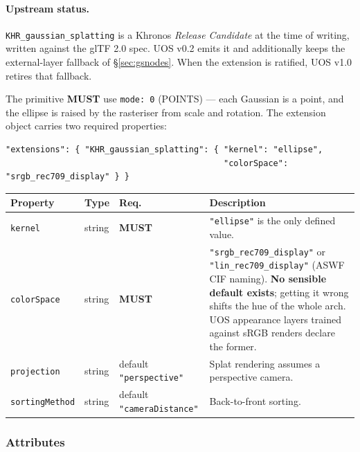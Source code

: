 \documentclass[11pt,a4paper]{article}
\newcommand{\MUST}{\textcolor{uosred}{\textbf{MUST}}}
\newcommand{\code}[1]{\texttt{\small #1}}
\begin{document}
\paragraph{Upstream status.} \code{KHR\_gaussian\_splatting} is a Khronos \emph{Release
Candidate} at the time of writing, written against the glTF 2.0 spec. UOS v0.2 emits it and
additionally keeps the external-layer fallback of \S\ref{sec:gsnodes}. When the extension
is ratified, UOS v1.0 retires that fallback.

\vspace{6px}
The primitive \MUST{} use \code{mode: 0} (POINTS) --- each Gaussian is a point, and the
ellipse is raised by the rasteriser from scale and rotation. The extension object carries
two required properties:

\begin{lstlisting}[style=js]
"extensions": { "KHR_gaussian_splatting": { "kernel": "ellipse",
                                            "colorSpace": "srgb_rec709_display" } }
\end{lstlisting}

\begin{longtable}{L{3.0cm} L{1.6cm} C{3.2cm} L{7.6cm}}
\toprule
\textbf{Property} & \textbf{Type} & \textbf{Req.} & \textbf{Description}\\
\midrule
\endhead
\code{kernel} & string & \MUST & \code{"ellipse"} is the only defined value.\\
\code{colorSpace} & string & \MUST & \code{"srgb\_rec709\_display"} or
\code{"lin\_rec709\_display"} (ASWF CIF naming). \textbf{No sensible default exists};
getting it wrong shifts the hue of the whole arch. UOS appearance layers trained against
sRGB renders declare the former.\\
\code{projection} & string & default \code{"perspective"} & Splat rendering assumes a
perspective camera.\\
\code{sortingMethod} & string & default \code{"cameraDistance"} & Back-to-front sorting.\\
\bottomrule
\end{longtable}

\subsubsection{Attributes}
\end{document}
